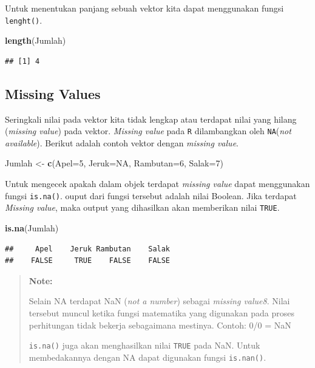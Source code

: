 \documentclass[]{book}
\newenvironment{Shaded}{\begin{snugshade}}{\end{snugshade}}
\newcommand{\KeywordTok}[1]{\textcolor[rgb]{0.13,0.29,0.53}{\textbf{#1}}}
\newcommand{\DataTypeTok}[1]{\textcolor[rgb]{0.13,0.29,0.53}{#1}}
\newcommand{\DecValTok}[1]{\textcolor[rgb]{0.00,0.00,0.81}{#1}}
\newcommand{\StringTok}[1]{\textcolor[rgb]{0.31,0.60,0.02}{#1}}
\newcommand{\OtherTok}[1]{\textcolor[rgb]{0.56,0.35,0.01}{#1}}
\newcommand{\NormalTok}[1]{#1}
\begin{document}
Untuk menentukan panjang sebuah vektor kita dapat menggunakan fungsi
\texttt{lenght()}.

\begin{Shaded}
\begin{Highlighting}[]
\KeywordTok{length}\NormalTok{(Jumlah)}
\end{Highlighting}
\end{Shaded}

\begin{verbatim}
## [1] 4
\end{verbatim}

\subsection{Missing Values}\label{missing-values}

Seringkali nilai pada vektor kita tidak lengkap atau terdapat nilai yang
hilang (\emph{missing value}) pada vektor. \emph{Missing value} pada
\texttt{R} dilambangkan oleh \texttt{NA}(\emph{not available}). Berikut
adalah contoh vektor dengan \emph{missing value}.

\begin{Shaded}
\begin{Highlighting}[]
\NormalTok{Jumlah <-}\StringTok{ }\KeywordTok{c}\NormalTok{(}\DataTypeTok{Apel=}\DecValTok{5}\NormalTok{, }\DataTypeTok{Jeruk=}\OtherTok{NA}\NormalTok{, }\DataTypeTok{Rambutan=}\DecValTok{6}\NormalTok{, }\DataTypeTok{Salak=}\DecValTok{7}\NormalTok{)}
\end{Highlighting}
\end{Shaded}

Untuk mengecek apakah dalam objek terdapat \emph{missing value} dapat
menggunakan fungsi \texttt{is.na()}. ouput dari fungsi tersebut adalah
nilai Boolean. Jika terdapat \emph{Missing value}, maka output yang
dihasilkan akan memberikan nilai \texttt{TRUE}.

\begin{Shaded}
\begin{Highlighting}[]
\KeywordTok{is.na}\NormalTok{(Jumlah)}
\end{Highlighting}
\end{Shaded}

\begin{verbatim}
##     Apel    Jeruk Rambutan    Salak 
##    FALSE     TRUE    FALSE    FALSE
\end{verbatim}

\begin{quote}
\textbf{Note: }

Selain NA terdapat NaN (\emph{not a number}) sebagai \emph{missing
value8}. Nilai tersebut muncul ketika fungsi matematika yang digunakan
pada proses perhitungan tidak bekerja sebagaimana mestinya. Contoh: 0/0
= NaN

\texttt{is.na()} juga akan menghasilkan nilai \texttt{TRUE} pada NaN.
Untuk membedakannya dengan NA dapat digunakan fungsi \texttt{is.nan()}.
\end{quote}
\end{document}
